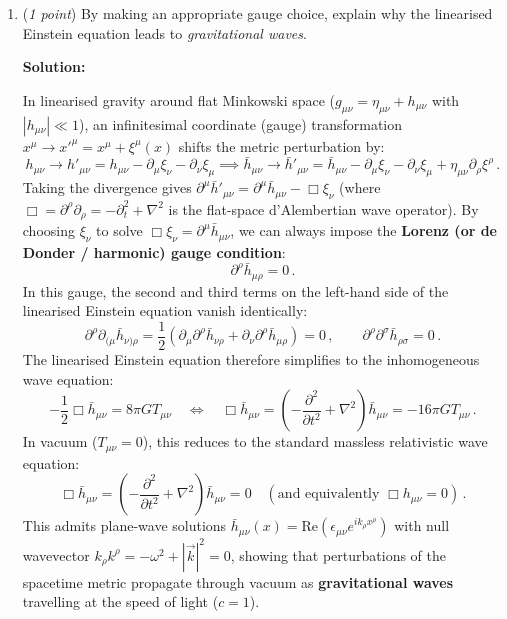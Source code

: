 \documentclass[12pt]{article}
\newcommand{\be}{\begin{equation}}
\newcommand{\ee}{\end{equation}}
\newcommand{\bh}{\bar{h}}
\begin{document}
\begin{enumerate}[label=\alph*)]
\item (\emph{1 point}) By making an appropriate gauge choice, explain why the linearised Einstein equation leads to \emph{gravitational waves}.

\medskip
\noindent\textbf{Solution:}

In linearised gravity around flat Minkowski space ($g_{\mu\nu} = \eta_{\mu\nu} + h_{\mu\nu}$ with $|h_{\mu\nu}| \ll 1$), an infinitesimal coordinate (gauge) transformation $x^\mu \to x'^\mu = x^\mu + \xi^\mu(x)$ shifts the metric perturbation by:
\be
h_{\mu\nu} \to h'_{\mu\nu} = h_{\mu\nu} - \partial_\mu \xi_\nu - \partial_\nu \xi_\mu \implies \bh_{\mu\nu} \to \bh'_{\mu\nu} = \bh_{\mu\nu} - \partial_\mu \xi_\nu - \partial_\nu \xi_\mu + \eta_{\mu\nu} \partial_\rho \xi^\rho \,.
\ee
Taking the divergence gives $\partial^\mu \bh'_{\mu\nu} = \partial^\mu \bh_{\mu\nu} - \Box \xi_\nu$ (where $\Box = \partial^\rho\partial_\rho = -\partial_t^2 + \nabla^2$ is the flat-space d'Alembertian wave operator). By choosing $\xi_\nu$ to solve $\Box \xi_\nu = \partial^\mu \bh_{\mu\nu}$, we can always impose the \textbf{Lorenz (or de Donder / harmonic) gauge condition}:
\be
\partial^\rho \bh_{\mu\rho} = 0 \,.
\ee
In this gauge, the second and third terms on the left-hand side of the linearised Einstein equation vanish identically:
\be
\partial^\rho \partial_{(\mu} \bh_{\nu)\rho} = \frac{1}{2}\left(\partial_\mu \partial^\rho \bh_{\nu\rho} + \partial_\nu \partial^\rho \bh_{\mu\rho}\right) = 0 \,, \qquad \partial^\rho \partial^\sigma \bh_{\rho\sigma} = 0 \,.
\ee
The linearised Einstein equation therefore simplifies to the inhomogeneous wave equation:
\be
-\frac{1}{2} \Box \bh_{\mu\nu} = 8\pi G T_{\mu\nu} \quad \Longleftrightarrow \quad \Box \bh_{\mu\nu} = \left(-\frac{\partial^2}{\partial t^2} + \nabla^2\right) \bh_{\mu\nu} = -16\pi G T_{\mu\nu} \,.
\ee
In vacuum ($T_{\mu\nu} = 0$), this reduces to the standard massless relativistic wave equation:
\be
\Box \bh_{\mu\nu} = \left(-\frac{\partial^2}{\partial t^2} + \nabla^2\right) \bh_{\mu\nu} = 0 \quad \left(\text{and equivalently } \Box h_{\mu\nu} = 0\right) \,.
\ee
This admits plane-wave solutions $\bh_{\mu\nu}(x) = \mathrm{Re}\left(\epsilon_{\mu\nu} e^{i k_\rho x^\rho}\right)$ with null wavevector $k_\rho k^\rho = -\omega^2 + |\vec{k}|^2 = 0$, showing that perturbations of the spacetime metric propagate through vacuum as \textbf{gravitational waves} travelling at the speed of light ($c = 1$).


\end{enumerate}
\end{document}
